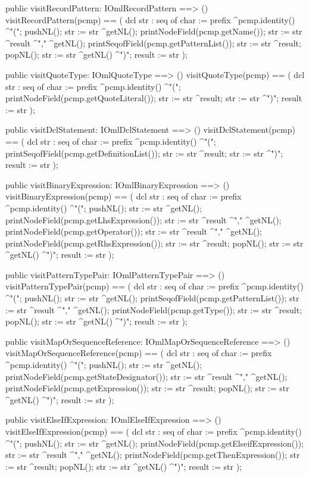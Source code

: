 \begin{vdm_al}
  public visitRecordPattern: IOmlRecordPattern ==> ()
  visitRecordPattern(pcmp) ==
    ( dcl str : seq of char := prefix ^pcmp.identity() ^"(";
      pushNL();
      str := str ^getNL();
      printNodeField(pcmp.getName());
      str := str ^result ^"," ^getNL();
      printSeqofField(pcmp.getPatternList());
      str := str ^result;
      popNL();
      str := str ^getNL() ^")";
      result := str );

  public visitQuoteType: IOmlQuoteType ==> ()
  visitQuoteType(pcmp) ==
    ( dcl str : seq of char := prefix ^pcmp.identity() ^"(";
      printNodeField(pcmp.getQuoteLiteral());
      str := str ^result;
      str := str ^")";
      result := str );

  public visitDclStatement: IOmlDclStatement ==> ()
  visitDclStatement(pcmp) ==
    ( dcl str : seq of char := prefix ^pcmp.identity() ^"(";
      printSeqofField(pcmp.getDefinitionList());
      str := str ^result;
      str := str ^")";
      result := str );

  public visitBinaryExpression: IOmlBinaryExpression ==> ()
  visitBinaryExpression(pcmp) ==
    ( dcl str : seq of char := prefix ^pcmp.identity() ^"(";
      pushNL();
      str := str ^getNL();
      printNodeField(pcmp.getLhsExpression());
      str := str ^result ^"," ^getNL();
      printNodeField(pcmp.getOperator());
      str := str ^result ^"," ^getNL();
      printNodeField(pcmp.getRhsExpression());
      str := str ^result;
      popNL();
      str := str ^getNL() ^")";
      result := str );

  public visitPatternTypePair: IOmlPatternTypePair ==> ()
  visitPatternTypePair(pcmp) ==
    ( dcl str : seq of char := prefix ^pcmp.identity() ^"(";
      pushNL();
      str := str ^getNL();
      printSeqofField(pcmp.getPatternList());
      str := str ^result ^"," ^getNL();
      printNodeField(pcmp.getType());
      str := str ^result;
      popNL();
      str := str ^getNL() ^")";
      result := str );

  public visitMapOrSequenceReference: IOmlMapOrSequenceReference ==> ()
  visitMapOrSequenceReference(pcmp) ==
    ( dcl str : seq of char := prefix ^pcmp.identity() ^"(";
      pushNL();
      str := str ^getNL();
      printNodeField(pcmp.getStateDesignator());
      str := str ^result ^"," ^getNL();
      printNodeField(pcmp.getExpression());
      str := str ^result;
      popNL();
      str := str ^getNL() ^")";
      result := str );

  public visitElseIfExpression: IOmlElseIfExpression ==> ()
  visitElseIfExpression(pcmp) ==
    ( dcl str : seq of char := prefix ^pcmp.identity() ^"(";
      pushNL();
      str := str ^getNL();
      printNodeField(pcmp.getElseifExpression());
      str := str ^result ^"," ^getNL();
      printNodeField(pcmp.getThenExpression());
      str := str ^result;
      popNL();
      str := str ^getNL() ^")";
      result := str );


\end{vdm_al}
